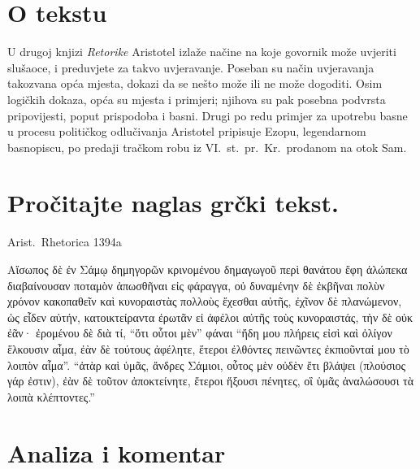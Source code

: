 
\section*{O tekstu}

U drugoj knjizi \textit{Retorike} Aristotel izlaže načine na koje govornik može uvjeriti slušaoce, i preduvjete za takvo uvjeravanje. Poseban su način uvjeravanja takozvana opća mjesta, dokazi da se nešto može ili ne može dogoditi. Osim logičkih dokaza, opća su mjesta i primjeri; njihova su pak posebna podvrsta pripovijesti, poput prispodoba i basni. Drugi po redu primjer za upotrebu basne u procesu političkog odlučivanja Aristotel pripisuje Ezopu, legendarnom basnopiscu, po predaji tračkom robu iz VI.~st.\ pr.~Kr.\ prodanom na otok Sam.


\section*{Pročitajte naglas grčki tekst.}

Arist.\ Rhetorica 1394a
\medskip

{\large
\begin{greek}
\noindent Αἴσωπος δὲ ἐν Σάμῳ δημηγορῶν κρινομένου δημαγωγοῦ περὶ θανάτου ἔφη ἀλώπεκα διαβαίνουσαν ποταμὸν ἀπωσθῆναι εἰς φάραγγα, οὐ δυναμένην δὲ ἐκβῆναι πολὺν χρόνον κακοπαθεῖν καὶ κυνοραιστὰς πολλοὺς ἔχεσθαι αὐτῆς, ἐχῖνον δὲ πλανώμενον, ὡς εἶδεν αὐτήν, κατοικτείραντα ἐρωτᾶν εἰ ἀφέλοι αὐτῆς τοὺς κυνοραιστάς, τὴν δὲ οὐκ ἐᾶν· ἐρομένου δὲ διὰ τί, ``ὅτι οὗτοι μὲν'' φάναι ``ἤδη μου πλήρεις εἰσὶ καὶ ὀλίγον ἕλκουσιν αἷμα, ἐὰν δὲ τούτους ἀφέλητε, ἕτεροι ἐλθόντες πεινῶντες ἐκπιοῦνταί μου τὸ λοιπὸν αἷμα''. ``ἀτὰρ καὶ ὑμᾶς, ἄνδρες Σάμιοι, οὗτος μὲν οὐδὲν ἔτι βλάψει (πλούσιος γάρ ἐστιν), ἐὰν δὲ τοῦτον ἀποκτείνητε, ἕτεροι ἥξουσι πένητες, οἳ ὑμᾶς ἀναλώσουσι τὰ λοιπὰ κλέπτοντες.''

\end{greek}
}

\newpage

\section*{Analiza i komentar}


